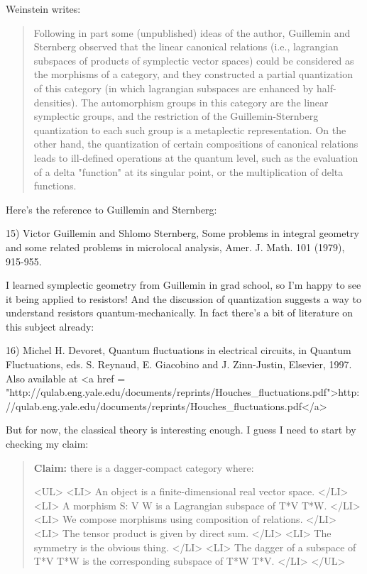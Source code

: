 Weinstein writes:

\begin{quote}
   Following in part some (unpublished) ideas of the author, Guillemin
   and Sternberg observed that the linear canonical relations (i.e.,
   lagrangian subspaces of products of symplectic vector spaces) could
   be considered as the morphisms of a category, and they constructed
   a partial quantization of this category (in which lagrangian subspaces
   are enhanced by half-densities).  The automorphism groups in this
   category are the linear symplectic groups, and the restriction of the
   Guillemin-Sternberg quantization to each such group is a
   metaplectic representation.  On the other hand, the quantization of
   certain compositions of canonical relations leads to ill-defined
   operations at the quantum level, such as the evaluation of a delta
   "function" at its singular point, or the multiplication of delta
   functions.
\end{quote}

Here's the reference to Guillemin and Sternberg:

15) Victor Guillemin and Shlomo Sternberg, Some problems in integral
geometry and some related problems in microlocal analysis, Amer. 
J. Math. 101 (1979), 915-955.

I learned symplectic geometry from Guillemin in grad school, so I'm
happy to see it being applied to resistors!  And the discussion of
quantization suggests a way to understand resistors quantum-mechanically.  
In fact there's a bit of literature on this subject already:

16) Michel H. Devoret, Quantum fluctuations in electrical circuits, 
in Quantum Fluctuations, eds. S. Reynaud, E. Giacobino and J. 
Zinn-Justin, Elsevier, 1997.  Also available at
<a href = "http://qulab.eng.yale.edu/documents/reprints/Houches_fluctuations.pdf">http://qulab.eng.yale.edu/documents/reprints/Houches_fluctuations.pdf</a>

But for now, the classical theory is interesting enough.  I guess I
need to start by checking my claim:

\begin{quote}
  \textbf{Claim:} there is a dagger-compact category where:

<UL>
<LI>
  An object is a finite-dimensional real vector space.  
</LI>
<LI>
  A morphism S: V \to  W is a Lagrangian subspace of T*V \times  T*W.
</LI>
<LI>
  We compose morphisms using composition of relations.
</LI>
<LI>
  The tensor product is given by direct sum.
</LI>
<LI>
  The symmetry is the obvious thing.
</LI>
<LI>
  The dagger of a subspace of T*V \times  T*W is the corresponding 
  subspace of T*W \times  T*V.  
</LI>
</UL>
\end{quote}

